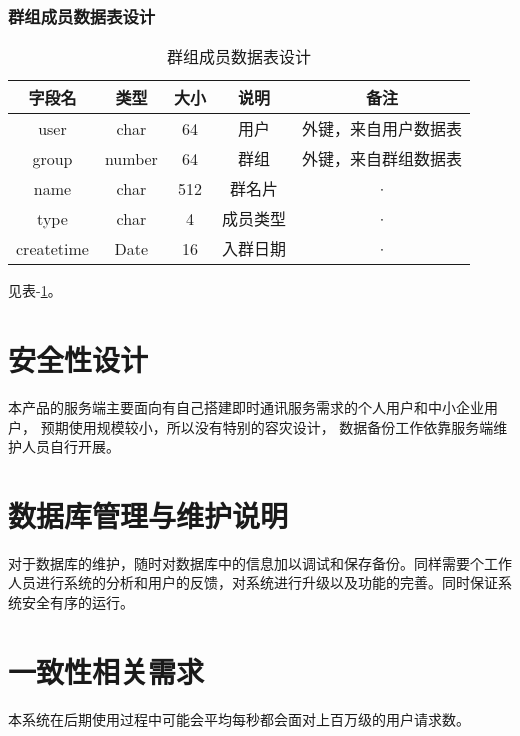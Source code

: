 \subsubsection{群组成员数据表设计}
\begin{table}[htbp]
	\centering
	\caption{群组成员数据表设计} \label{tab:usergroup-database}
	\begin{tabular}{|c|c|c|c|c|}
		\hline
		字段名     & 类型 & 大小 & 说明     & 备注                 \\
		\hline
		user       & char & 64   & 用户     & 外键，来自用户数据表 \\
		\hline
		group       & number & 64   & 群组     & 外键，来自群组数据表 \\
		\hline
		name       & char & 512  & 群名片   & ·                    \\
		\hline
		type       & char & 4    & 成员类型 & ·                    \\
		\hline
		createtime & Date & 16   & 入群日期 & ·                    \\
		\hline
	\end{tabular}
\end{table}
见表-\ref{tab:usergroup-database}。


\section{安全性设计}
本产品的服务端主要面向有自己搭建即时通讯服务需求的个人用户和中小企业用户，
预期使用规模较小，所以没有特别的容灾设计，
数据备份工作依靠服务端维护人员自行开展。

\section{数据库管理与维护说明}
对于数据库的维护，随时对数据库中的信息加以调试和保存备份。同样需要个工作人员进行系统的分析和用户的反馈，对系统进行升级以及功能的完善。同时保证系统安全有序的运行。

{\color{red}
\section{一致性相关需求}
本系统在后期使用过程中可能会平均每秒都会面对上百万级的用户请求数。
}

